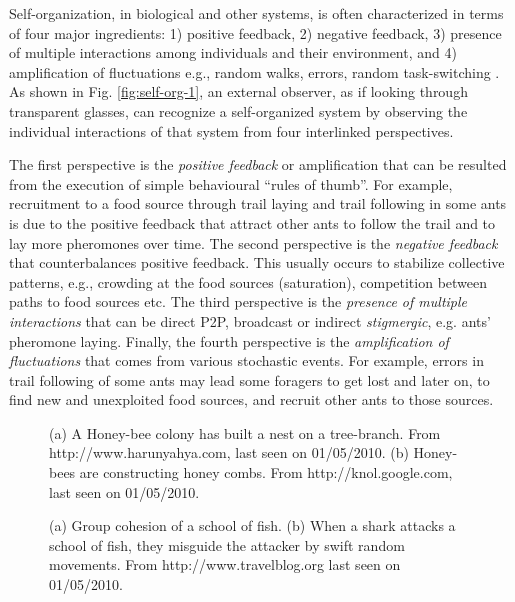 Self-organization, in biological and  other systems, is often characterized in terms of four major ingredients: 1) positive feedback, 2) negative feedback, 3) presence of multiple interactions among individuals and their environment, and 4) amplification of fluctuations  e.g., random walks, errors, random task-switching \cite{Camazine+2001}. As shown in Fig. \ref{fig:self-org-1}, an external observer, as if looking through transparent glasses, can recognize a self-organized system by observing the individual interactions of that system from four interlinked perspectives. 

The first perspective is the {\em  positive feedback} or amplification that can be resulted from the execution of simple behavioural ``rules of thumb''. For example, recruitment to a food source through trail laying and trail following in some ants  is due to the positive feedback that attract other ants to follow the trail and to lay more pheromones over time. The second perspective is the {\em negative feedback} that counterbalances positive feedback. This usually occurs to stabilize collective patterns, e.g., crowding at the food sources (saturation), competition between paths to food sources etc. The third perspective is the {\em presence of multiple  interactions} that can be direct \acf{P2P}, broadcast or indirect {\em stigmergic}, e.g. ants' pheromone laying. Finally, the fourth  perspective is the {\em amplification of fluctuations} that comes from various stochastic events. For example, errors in trail following of some ants may lead some foragers to get lost and later on, to find new and unexploited food sources, and recruit other ants to those sources.
\begin{figure}[H]
\centering
{} 
\hspace{0.25cm}
\caption{(a) A Honey-bee colony has built a nest on a tree-branch. From http://www.harunyahya.com, last seen on 01/05/2010. (b) Honey-bees are constructing honey combs. From http://knol.google.com, last seen on 01/05/2010.}
\label{fig:honey-bee-nest}
\end{figure}
% 
\begin{figure}[H]
\centering
{} 
\hspace{0.25cm}
\caption{(a) Group cohesion of a school of fish. (b) When a shark attacks a school of fish, they misguide the attacker by swift random movements. From http://www.travelblog.org last seen on 01/05/2010.}
\label{fig:school-of-fish}
\end{figure}

